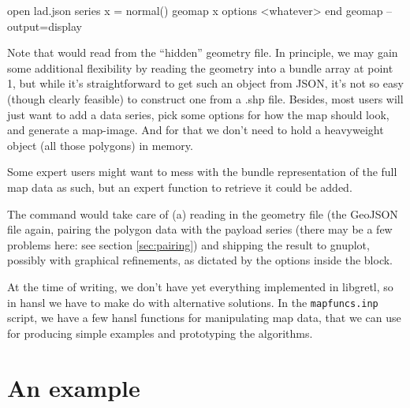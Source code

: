 \documentclass{article}
\begin{document}
\begin{scode}
  open lad.json 
  series x = normal() 
  geomap x 
     options <whatever> 
  end geomap --output=display
\end{scode}

Note that  would read from the ``hidden'' geometry
file. In principle, we may gain some additional flexibility by reading
the geometry into a bundle array at point 1, but while it's
straightforward to get such an object from JSON, it's not so easy
(though clearly feasible) to construct one from a .shp file. Besides,
most users will just want to add a data series, pick some options for
how the map should look, and generate a map-image.  And for that we
don't need to hold a heavyweight object (all those polygons) in
memory.

Some expert users might want to mess with the bundle
representation of the full map data as such, but an expert function to
retrieve it could be added.

The  command would take care of (a) reading in the
geometry file (the GeoJSON file again, pairing the polygon data with
the payload series (there may be a few problems here: see section
\ref{sec:pairing}) and shipping the result to gnuplot, possibly with
graphical refinements, as dictated by the options inside the block.

At the time of writing, we don't have yet everything implemented in
libgretl, so in hansl we have to make do with alternative
solutions. In the \texttt{mapfuncs.inp} script, we have a few hansl
functions for manipulating map data, that we can use for producing
simple examples and prototyping the algorithms.

\section{An example}
\label{sec:example}
\end{document}
